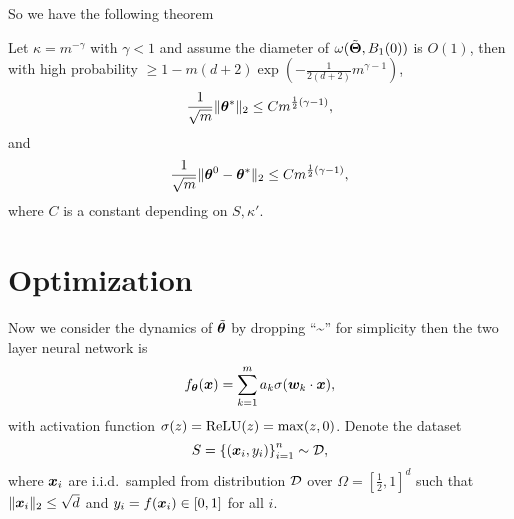 \documentclass{article}
\begin{document}
So we have the following theorem
\begin{thm}
    Let $\kappa=m^{-\gamma}$ with $\gamma<1$ and assume the diameter of $\omega(\tilde{\bm{\Theta}}, B_1(0))$ is $O(1)$, then with high probability $\geq 1 - m(d+2)\exp (-\frac{1}{2(d+2)}m^{\gamma-1})$,
    \begin{equation}
        \frac{1}{\sqrt{m}}\lVert\bm{\theta}^*\rVert_2\leq C m^{\frac{1}{2}(\gamma - 1)},
    \end{equation}
    and
    \begin{equation}
        \frac{1}{\sqrt{m}}\lVert\bm{\theta}^0 - \bm{\theta}^*\rVert_2\leq C m^{\frac{1}{2}(\gamma-1)},
    \end{equation}
    where $C$ is a constant depending on $S, \kappa'$.
\end{thm}

\section{Optimization}

Now we consider the dynamics of $\tilde{\bm{\theta}}$ by dropping ``\textasciitilde{}'' for simplicity then the two layer neural network is
\begin{equation}
    f_{\bm{\theta}}(\bm{x}) = \sum_{k=1}^{m} a_k\sigma(\bm{w}_k\cdot\bm{x}),
\end{equation}
with activation function $\sigma(z) = \mathrm{ReLU}(z) = \max(z, 0)$. Denote the dataset
\begin{equation}
    S = {\{(\bm{x}_i, y_i)\}}_{i=1}^n \sim \mathcal{D},
\end{equation}
where $\bm{x}_i$ are i.i.d.\ sampled from distribution $\mathcal{D}$ over $\Omega={[\frac{1}{2},1]}^d$ such that $\lVert\bm{x}_i\rVert_2\leq\sqrt{d}$ and $y_i=f(\bm{x}_i)\in[0,1]$ for all $i$.
\end{document}
